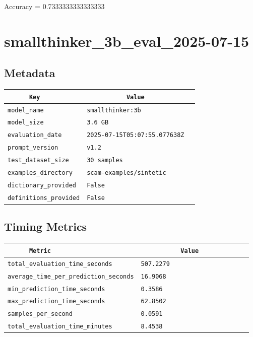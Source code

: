 \documentclass{article}
\begin{document}
\begin{center}
Accuracy = 0.7333333333333333
\end{center}

\section{smallthinker\_3b\_eval\_2025-07-15}
\subsection{Metadata}

\begin{center}
\begin{tabular}{l | l} \hline
    \verb|      Key      | & \verb|           Value           | \\ \hline
    \hline
    \verb|model_name    | & \verb|smallthinker:3b              | \\ \hline
    \verb|model_size    | & \verb|3.6 GB                       | \\ \hline
    \verb|evaluation_date| & \verb|2025-07-15T05:07:55.077638Z  | \\ \hline
    \verb|prompt_version| & \verb|v1.2                         | \\ \hline
    \verb|test_dataset_size| & \verb|30 samples                   | \\ \hline
    \verb|examples_directory| & \verb|scam-examples/sintetic       | \\ \hline
    \verb|dictionary_provided| & \verb|False                        | \\ \hline
    \verb|definitions_provided| & \verb|False                        | \\ \hline
\end{tabular}
\end{center}

\subsection{Timing Metrics}

\begin{center}
\begin{tabular}{l | l} \hline
    \verb|      Metric     | & \verb|           Value           | \\ \hline
    \hline
    \verb|total_evaluation_time_seconds| & \verb|507.2279                     | \\ \hline
    \verb|average_time_per_prediction_seconds| & \verb|16.9068                      | \\ \hline
    \verb|min_prediction_time_seconds| & \verb|0.3586                       | \\ \hline
    \verb|max_prediction_time_seconds| & \verb|62.8502                      | \\ \hline
    \verb|samples_per_second| & \verb|0.0591                       | \\ \hline
    \verb|total_evaluation_time_minutes| & \verb|8.4538                       | \\ \hline
\end{tabular}
\end{center}
\end{document}
